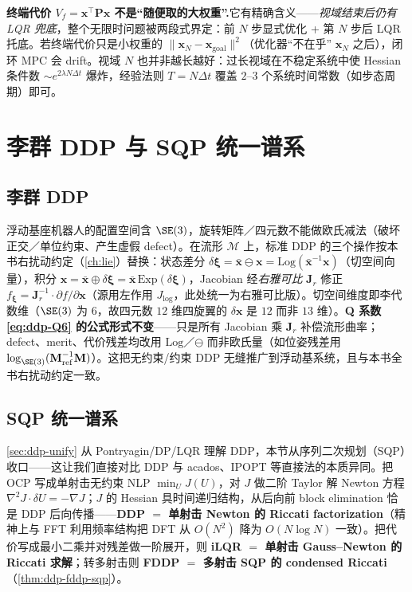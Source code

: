\begin{insight}
\textbf{终端代价 $V_f=\mathbf{x}^\top\mathbf{P}\mathbf{x}$ 不是“随便取的大权重”.}\;它有精确含义——\emph{视域结束后仍有 LQR 兜底}，整个无限时问题被两段式界定：前 $N$ 步显式优化 + 第 $N$ 步后 LQR 托底。若终端代价只是小权重的 $\|\mathbf{x}_N-\mathbf{x}_{\mathrm{goal}}\|^2$（优化器“不在乎” $\mathbf{x}_N$ 之后），闭环 MPC 会 drift。视域 $N$ 也并非越长越好：过长视域在不稳定系统中使 Hessian 条件数 $\sim e^{2\lambda N\Delta t}$ 爆炸，经验法则 $T=N\Delta t$ 覆盖 $2$--$3$ 个系统时间常数（如步态周期）即可。
\end{insight}

\section{李群 DDP 与 SQP 统一谱系}
\label{sec:ddp-lie-sqp}

\subsection{李群 DDP}
\label{sec:ddp-lie}

浮动基座机器人的配置空间含 $\SE(3)$，旋转矩阵／四元数不能做欧氏减法（破坏正交／单位约束、产生虚假 defect）。在流形 $\mathcal{M}$ 上，标准 DDP 的三个操作按本书右扰动约定（\cref{ch:lie}）替换：状态差分 $\delta\boldsymbol{\xi}=\bar{\mathbf{x}}\ominus\mathbf{x}=\mathrm{Log}(\bar{\mathbf{x}}^{-1}\mathbf{x})$（切空间向量），积分 $\mathbf{x}=\bar{\mathbf{x}}\oplus\delta\boldsymbol{\xi}=\bar{\mathbf{x}}\,\mathrm{Exp}(\delta\boldsymbol{\xi})$，Jacobian 经\emph{右雅可比} $\mathbf{J}_r$ 修正 $f_{\boldsymbol{\xi}}=\mathbf{J}_r^{-1}\cdot\partial f/\partial\mathbf{x}$（源用左作用 $J_{\log}$，此处统一为右雅可比版）。切空间维度即李代数维（$\SE(3)$ 为 $6$，故四元数 $12$ 维四旋翼的 $\delta\mathbf{x}$ 是 $12$ 而非 $13$ 维）。\textbf{Q 系数 \cref{eq:ddp-Q6} 的公式形式不变}——只是所有 Jacobian 乘 $\mathbf{J}_r$ 补偿流形曲率；defect、merit、代价残差均改用 $\mathrm{Log}$／$\ominus$ 而非欧氏量（如位姿残差用 $\log_{\SE(3)}(\mathbf{M}_{\mathrm{ref}}^{-1}\mathbf{M})$）。这把无约束/约束 DDP 无缝推广到浮动基系统，且与本书全书右扰动约定一致。

\subsection{SQP 统一谱系}
\label{sec:ddp-sqp}

\cref{sec:ddp-unify} 从 Pontryagin/DP/LQR 理解 DDP，本节从序列二次规划（SQP）收口——这让我们直接对比 DDP 与 acados、IPOPT 等直接法的本质异同。把 OCP 写成单射击无约束 NLP $\min_U J(U)$，对 $J$ 做二阶 Taylor 解 Newton 方程 $\nabla^2 J\cdot\delta U=-\nabla J$；$J$ 的 Hessian 具时间递归结构，从后向前 block elimination 恰是 DDP 后向传播——\textbf{DDP $=$ 单射击 Newton 的 Riccati factorization}（精神上与 FFT 利用频率结构把 DFT 从 $O(N^2)$ 降为 $O(N\log N)$ 一致）。把代价写成最小二乘并对残差做一阶展开，则 \textbf{iLQR $=$ 单射击 Gauss--Newton 的 Riccati 求解}；转多射击则 \textbf{FDDP $=$ 多射击 SQP 的 condensed Riccati}（\cref{thm:ddp-fddp-sqp}）。

